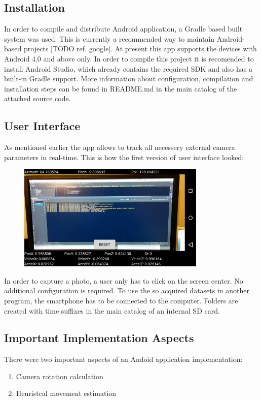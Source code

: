 \subsection{Installation}
In order to compile and distribute Android application, a Gradle based built system was used. This is currently a recommended way to maintain Android-based projects [TODO ref. google]. At present this app supports the devices with Android 4.0 and above only. In order to compile this project it is recomended to install Android Studio, which already contains the required SDK and also has a built-in Gradle support. More information about configuration, compilation and installation steps can be found in README.md in the main catalog of the attached source code. 
\subsection{User Interface}
As mentioned earlier the app allows to track all necessery external camera parameters in real-time. This is how the first version of user interface looked:
\begin{figure}[h!]
    \centering
    \includegraphics[width=0.8\textwidth]{AndroidScreenShot}
    \caption{}
    \label{fig:AndroidScreenShot}
\end{figure}
\clearpage
In order to capture a photo, a user only has to click on the screen center. No additional configuration is required. To use the so acquired datasets in another program, the smartphone has to be connected to the computer. Folders are created with time suffixes in the main catalog of an internal SD card.
\subsection{Important Implementation Aspects}
There were two important aspects of an Andoid application implementation:
\begin{enumerate}
\item Camera rotation calculation
\item Heuristcal movement estimation
\end{enumerate}
